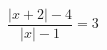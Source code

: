 \begin{ex}[type=equation]
	\begin{condition}
		$\dfrac{\big|x + 2\big| - 4}{\big|x\big| - 1} = 3$
	\end{condition}
\end{ex}